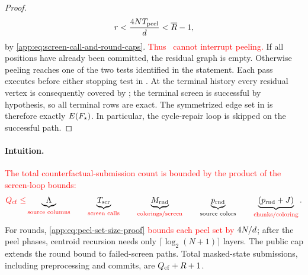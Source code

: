 \begin{proof}
{\begin{equation}
 r<\frac{4NT_{\mathrm{peel}}}{d}<\overline R-1,
 \label{app:eq:peel-before-hard-cap}
\end{equation}}
by \eqref{app:eq:screen-call-and-round-caps}.
\textcolor{red}{Thus \AlgoGuardRef\ cannot interrupt peeling.}
If all positions have already been committed, the residual graph is empty.
Otherwise peeling reaches one of the two tests identified in the statement.
Each pass executes  before either stopping test
in .  At the
terminal history every residual vertex is consequently covered by
\AppLowDegreeScreenRef; the terminal screen is successful by
hypothesis, so all terminal rows are exact.  The
symmetrized edge set in  is therefore
exactly $E(F_{\star})$.  In particular, the cycle-repair loop
is skipped on the successful path.
\end{proof}



\paragraph{Intuition.}
\textcolor{red}{The total counterfactual-submission count is bounded by the
product of the screen-loop bounds:}
\[
 \textcolor{red}{Q_{\mathrm{cf}}\le}
 \underbrace{\Lambda}_{\text{\textcolor{red}{source columns}}}\qquad
 \underbrace{T_{\mathrm{scr}}}_{\text{\textcolor{red}{screen calls}}}\qquad
 \underbrace{M_{\mathrm{rnd}}}_{\text{\textcolor{red}{colorings/screen}}}\qquad
 \underbrace{p_{\mathrm{rnd}}}_{\text{source colors}}\qquad
 \underbrace{(p_{\mathrm{rnd}}+J)}_{\text{\textcolor{red}{chunks/coloring}}}.
\]
For rounds, \textcolor{red}{\cref{app:eq:peel-set-size-proof} bounds each peel set by}
$4N/d$; after the peel phases, centroid recursion needs only
$\lceil\log_2(N+1)\rceil$ layers.  The public cap extends the round bound to
failed-screen paths.  Total masked-state submissions, including
preprocessing and commits, are $Q_{\mathrm{cf}}+R+1$.


